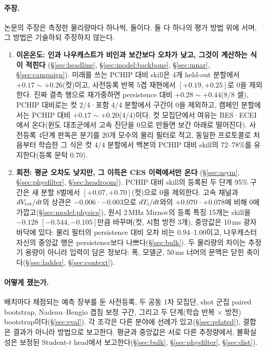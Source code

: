 \documentclass[10pt,a4paper]{article}
\begin{document}
\paragraph{주장.}
논문의 주장은 측정한 물리량마다 하나씩, 둘이다. 둘 다 하나의 평가 방법 위에 서며, 그
방법은 기술하되 주장하지 않는다.
\begin{enumerate}
  \item \textbf{이온온도: 인과 나우캐스트가 비인과 보간보다 오차가 낮고, 그것이
        계산하는 식이 적힌다} (\S\ref{sec:headline}, \S\ref{sec:model:backbone},
        \S\ref{sec:mnar}, \S\ref{sec:campaign}). 미래를 쓰는 PCHIP 대비 skill은 4개
        held-out 분할에서 $+0.17\sim+0.26$(컷)이고, 사전등록 반복 5겹 재현에서
        $[+0.19, +0.25]$로 0을 제외한다. 진짜 결측 행으로 재가중하면 persistence 대비 $+0.28\sim+0.44$(8/8 셀), PCHIP
        대비로는 컷 2/4·포함 4/4 분할에서 구간이 0을 제외하고, 캠페인 분할에서는 PCHIP
        대비 $+0.17\sim+0.20$(4/4)이다.
        컷 모집단에서 여유는 BES·ECEI에서 온다(윈도 대조군에서 고속 진단을 0으로
        만들면 보간 아래로 떨어진다). 사전등록 4단계 판독은 \Ti{} 분기를 20개 모수의 물리
        필터로 적고, 동일한 프로토콜로 처음부터 학습한 그 식은 컷 4/4 분할에서 백본의
        PCHIP 대비 skill의 72--78\%를 유지한다(등록 문턱 0.70).
  \item \textbf{회전: 평균 오차도 낮지만, 그 이득은 CES 이력에서만 온다}
        (\S\ref{sec:asym}, \S\ref{sec:physfilter}, \S\ref{sec:headroom}). PCHIP 대비
        skill의 등록된 두 단계 95\% 구간은 새 분할 8벌에서 $[+0.07, +0.70]$(컷)으로
        0을 제외한다. 고속 채널과 $dV_\mathrm{rot}/dt$의 상관은 $-0.006$·$-0.003$으로
        $dT_i/dt$와의 $+0.070$·$+0.078$에 비해 0에 가깝고(\S\ref{sec:model:physics}),
        원시 2\,MHz Mirnov의 등록 특징 15개는 skill을 $-0.128$ $[-0.544, -0.105]$만큼
        바꾸며(컷, 시험 방전 3개), 중앙값은 10\,ms 광자 바닥에 있다:
        물리 필터의 persistence 대비 오차 비는 0.94--1.00이고, 나우캐스터 자신의
        중앙값 행은 persistence보다 나쁘다(\S\ref{sec:bulk}). 두 물리량의 차이는 추정기 용량이 아니라 입력이 담은
        정보다: 폭, 모델군, 50\,ms 너머의 문맥은 닫힌 축이다(\S\ref{sec:ladder},
        \S\ref{sec:context}).
\end{enumerate}
\paragraph{어떻게 쟀는가.} 배치마다 채점되는 예측 장부를 둔 사전등록, 두 공동 1차
모집단, shot 군집 paired bootstrap, Nadeau--Bengio 겹침 보정 구간, 그리고 두
단계(학습 반복 $\times$ 방전) bootstrap이다(\S\ref{sec:eval}). 각 조각은 다른 분야에
선례가 있고(\S\ref{sec:related}), 결합은 결과가 아니라 방법으로 보고한다. 평균과
중앙값은 서로 다른 추정량에서, 불확실성은 보정된 Student-$t$ head에서
보고한다(\S\ref{sec:bulk}, \S\ref{sec:physfilter}, \S\ref{sec:dist}).
\end{document}
